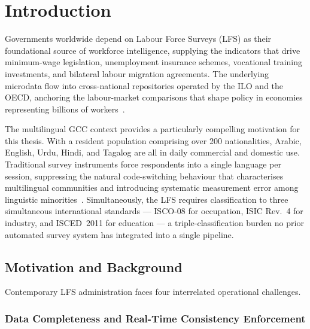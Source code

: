 \chapter{Introduction}
\label{chap:intro}

Governments worldwide depend on Labour Force Surveys (LFS) as their
foundational source of workforce intelligence, supplying the indicators that
drive minimum-wage legislation, unemployment insurance schemes, vocational
training investments, and bilateral labour migration agreements.
The underlying microdata flow into cross-national repositories operated by
the ILO and the OECD, anchoring the labour-market comparisons that
shape policy in economies representing billions of workers~\cite{ilo2012isco_v1,zhang2025synthetic}.

The multilingual GCC context provides a particularly compelling motivation for this thesis.
With a resident population comprising over 200 nationalities, Arabic, English,
Urdu, Hindi, and Tagalog are all in daily commercial and domestic use.
Traditional survey instruments force respondents into a single language per
session, suppressing the natural code-switching behaviour that characterises
multilingual communities and introducing systematic measurement error among
linguistic minorities~\cite{hamed2025codeswitching}.
Simultaneously, the LFS requires classification to three simultaneous
international standards --- ISCO-08 for occupation, ISIC Rev.~4 for industry,
and ISCED~2011 for education --- a triple-classification burden no prior
automated survey system has integrated into a single pipeline.

\section{Motivation and Background}
\label{sec:motivation}

Contemporary LFS administration faces four interrelated operational challenges.

\subsection{Data Completeness and Real-Time Consistency Enforcement}

